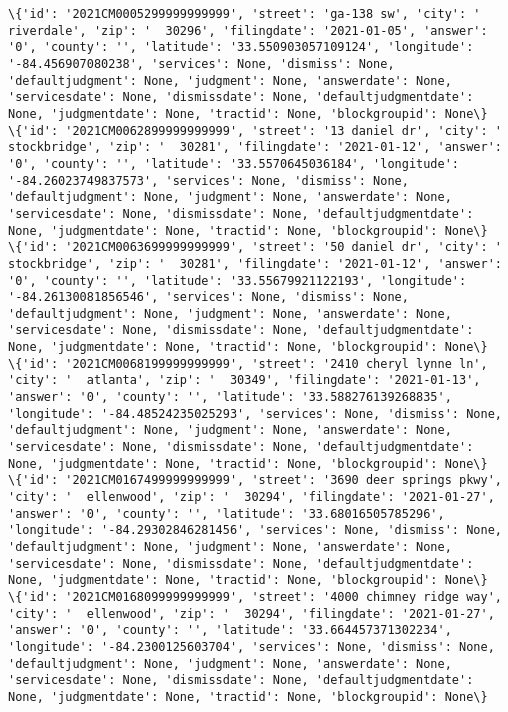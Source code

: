 \documentclass[11pt]{article}
\begin{document}
\begin{Verbatim}[commandchars=\\\{\}]
\{'id': '2021CM0005299999999999', 'street': 'ga-138 sw', 'city': '  riverdale', 'zip': '  30296', 'filingdate': '2021-01-05', 'answer': '0', 'county': '', 'latitude': '33.550903057109124', 'longitude': '-84.456907080238', 'services': None, 'dismiss': None, 'defaultjudgment': None, 'judgment': None, 'answerdate': None, 'servicesdate': None, 'dismissdate': None, 'defaultjudgmentdate': None, 'judgmentdate': None, 'tractid': None, 'blockgroupid': None\}
\{'id': '2021CM0062899999999999', 'street': '13 daniel dr', 'city': '  stockbridge', 'zip': '  30281', 'filingdate': '2021-01-12', 'answer': '0', 'county': '', 'latitude': '33.5570645036184', 'longitude': '-84.26023749837573', 'services': None, 'dismiss': None, 'defaultjudgment': None, 'judgment': None, 'answerdate': None, 'servicesdate': None, 'dismissdate': None, 'defaultjudgmentdate': None, 'judgmentdate': None, 'tractid': None, 'blockgroupid': None\}
\{'id': '2021CM0063699999999999', 'street': '50 daniel dr', 'city': '  stockbridge', 'zip': '  30281', 'filingdate': '2021-01-12', 'answer': '0', 'county': '', 'latitude': '33.55679921122193', 'longitude': '-84.26130081856546', 'services': None, 'dismiss': None, 'defaultjudgment': None, 'judgment': None, 'answerdate': None, 'servicesdate': None, 'dismissdate': None, 'defaultjudgmentdate': None, 'judgmentdate': None, 'tractid': None, 'blockgroupid': None\}
\{'id': '2021CM0068199999999999', 'street': '2410 cheryl lynne ln', 'city': '  atlanta', 'zip': '  30349', 'filingdate': '2021-01-13', 'answer': '0', 'county': '', 'latitude': '33.588276139268835', 'longitude': '-84.48524235025293', 'services': None, 'dismiss': None, 'defaultjudgment': None, 'judgment': None, 'answerdate': None, 'servicesdate': None, 'dismissdate': None, 'defaultjudgmentdate': None, 'judgmentdate': None, 'tractid': None, 'blockgroupid': None\}
\{'id': '2021CM0167499999999999', 'street': '3690 deer springs pkwy', 'city': '  ellenwood', 'zip': '  30294', 'filingdate': '2021-01-27', 'answer': '0', 'county': '', 'latitude': '33.68016505785296', 'longitude': '-84.29302846281456', 'services': None, 'dismiss': None, 'defaultjudgment': None, 'judgment': None, 'answerdate': None, 'servicesdate': None, 'dismissdate': None, 'defaultjudgmentdate': None, 'judgmentdate': None, 'tractid': None, 'blockgroupid': None\}
\{'id': '2021CM0168099999999999', 'street': '4000 chimney ridge way', 'city': '  ellenwood', 'zip': '  30294', 'filingdate': '2021-01-27', 'answer': '0', 'county': '', 'latitude': '33.664457371302234', 'longitude': '-84.2300125603704', 'services': None, 'dismiss': None, 'defaultjudgment': None, 'judgment': None, 'answerdate': None, 'servicesdate': None, 'dismissdate': None, 'defaultjudgmentdate': None, 'judgmentdate': None, 'tractid': None, 'blockgroupid': None\}

\end{Verbatim}
\end{document}
